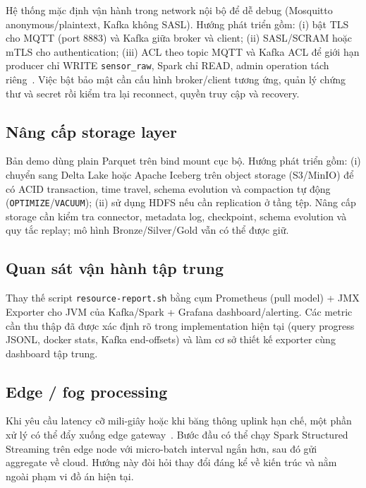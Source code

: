 Hệ thống mặc định vận hành trong network nội bộ để dễ debug (Mosquitto
anonymous/plaintext, Kafka không SASL). Hướng phát triển gồm: (i) bật TLS
cho MQTT (port 8883) và Kafka giữa broker và client; (ii) SASL/SCRAM hoặc
mTLS cho authentication; (iii) ACL theo topic MQTT và Kafka ACL để giới hạn
producer chỉ WRITE \texttt{sensor\_raw}, Spark chỉ READ, admin operation tách
riêng~\cite{kafka_security_overview}. Việc bật bảo mật cần cấu hình broker/client tương ứng, quản lý chứng thư
và secret rồi kiểm tra lại reconnect, quyền truy cập và recovery.

\subsection{Nâng cấp storage layer}

Bản demo dùng plain Parquet trên bind mount cục bộ. Hướng phát triển gồm:
(i) chuyển sang Delta Lake hoặc Apache Iceberg trên object storage (S3/MinIO)
để có ACID transaction, time travel, schema evolution và compaction tự động
(\texttt{OPTIMIZE}/\texttt{VACUUM}); (ii) sử dụng HDFS nếu cần replication
ở tầng tệp. Nâng cấp storage cần kiểm tra connector, metadata log, checkpoint, schema
evolution và quy tắc replay; mô hình Bronze/Silver/Gold vẫn có thể được giữ.

\subsection{Quan sát vận hành tập trung}

Thay thế script \texttt{resource-report.sh} bằng cụm Prometheus (pull model)
+ JMX Exporter cho JVM của Kafka/Spark + Grafana dashboard/alerting. Các
metric cần thu thập đã được xác định rõ trong implementation hiện tại (query
progress JSONL, docker stats, Kafka end-offsets) và làm cơ sở thiết kế exporter cùng dashboard tập trung.

\subsection{Edge / fog processing}

Khi yêu cầu latency cỡ mili-giây hoặc khi băng thông uplink hạn chế, một phần
xử lý có thể đẩy xuống edge gateway~\cite{iot_big_data_survey_2022,
iot_stream_latency_2021}. Bước đầu có thể chạy Spark Structured Streaming trên
edge node với micro-batch interval ngắn hơn, sau đó gửi aggregate về cloud.
Hướng này đòi hỏi thay đổi đáng kể về kiến trúc và nằm ngoài phạm vi đồ án
hiện tại.

